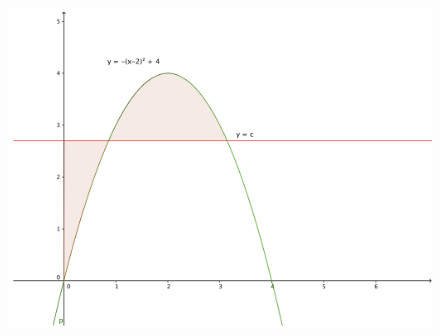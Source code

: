 \documentclass[a4paper]{article}
\begin{document}
\begin{enumerate}
\begin{figure}[ht!]
	\centering
  \includegraphics[width=1.2\textwidth]{seven.PNG}
\end{figure}	


\end{enumerate}
\end{document}
